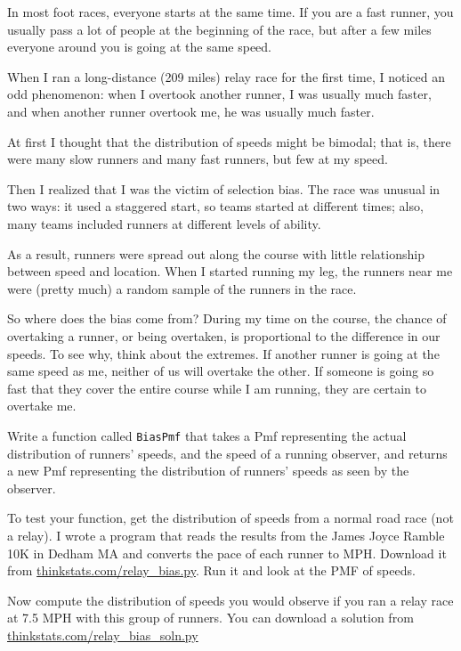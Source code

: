 \documentclass[12pt]{book}
\begin{document}
\begin{ex}

In most foot races, everyone starts at the same time.  If you are a
fast runner, you usually pass a lot of people at the beginning of the
race, but after a few miles everyone around you is going at the same
speed.

When I ran a long-distance (209 miles) relay race for the first
time, I noticed an odd phenomenon: when I overtook another runner, I
was usually much faster, and when another runner overtook me, he was
usually much faster.

At first I thought that the distribution of speeds might be bimodal;
that is, there were many slow runners and many fast runners, but few
at my speed.

Then I realized that I was the victim of selection bias.  The race
was unusual in two ways: it used a staggered start, so teams started
at different times; also, many teams included runners at different
levels of ability.

As a result, runners were spread out along the course with little
relationship between speed and location.  When I started running my
leg, the runners near me were (pretty much) a random sample of the
runners in the race.

So where does the bias come from?  During my time on the course, the
chance of overtaking a runner, or being overtaken, is proportional to
the difference in our speeds.  To see why, think about the extremes.
If another runner is going at the same speed as me, neither of us will
overtake the other.  If someone is going so fast that they cover the
entire course while I am running, they are certain to overtake me.

Write a function called {\tt BiasPmf} that takes a Pmf representing
the actual distribution of runners' speeds, and the speed of a running
observer, and returns a new Pmf representing the distribution of
runners' speeds as seen by the observer.

To test your function, get the distribution of speeds from a
normal road race (not a relay).  I wrote a program that reads the
results from the James Joyce Ramble 10K in Dedham MA and converts the
pace of each runner to MPH.  Download it from
\url{thinkstats.com/relay_bias.py}.  Run it and look at the PMF of
speeds.

Now compute the distribution of speeds you would observe if you
ran a relay race at 7.5 MPH with this group of runners.  You can download
a solution from \url{thinkstats.com/relay_bias_soln.py}

\end{ex}
\end{document}
